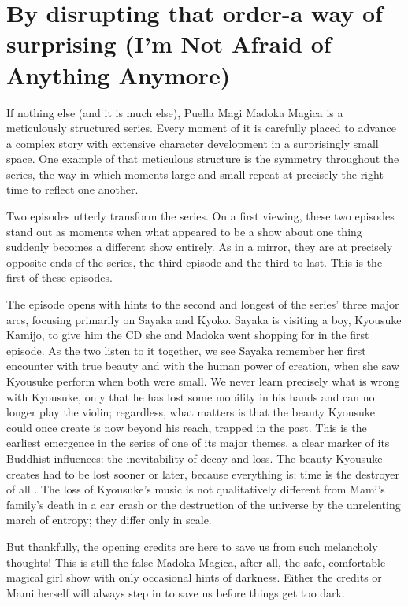 \chapter{By disrupting that order-a way of surprising (I'm Not Afraid of Anything Anymore)}

If nothing else (and it is much else), Puella Magi Madoka Magica is a meticulously structured series. Every moment of it is carefully placed to advance a complex story with extensive character development in a surprisingly small space. One example of that meticulous structure is the symmetry throughout the series, the way in which moments large and small repeat at precisely the right time to reflect one another.

Two episodes utterly transform the series. On a first viewing, these two episodes stand out as moments when what appeared to be a show about one thing suddenly becomes a different show entirely. As in a mirror, they are at precisely opposite ends of the series, the third episode and the third-to-last. This is the first of these episodes.

The episode opens with hints to the second and longest of the series' three major arcs, focusing primarily on Sayaka and Kyoko. Sayaka is visiting a boy, Kyousuke Kamijo, to give him the CD she and Madoka went shopping for in the first episode. As the two listen to it together, we see Sayaka remember her first encounter with true beauty and with the human power of creation, when she saw Kyousuke perform when both were small. We never learn precisely what is wrong with Kyousuke, only that he has lost some mobility in his hands and can no longer play the violin; regardless, what matters is that the beauty Kyousuke could once create is now beyond his reach, trapped in the past. This is the earliest emergence in the series of one of its major themes, a clear marker of its Buddhist influences: the inevitability of decay and loss. The beauty Kyousuke creates had to be lost sooner or later, because everything is; time is the destroyer of all \cite{ref33}. The loss of Kyousuke's music is not qualitatively different from Mami's family's death in a car crash or the destruction of the universe by the unrelenting march of entropy; they differ only in scale.

But thankfully, the opening credits are here to save us from such melancholy thoughts! This is still the false Madoka Magica, after all, the safe, comfortable magical girl show with only occasional hints of darkness. Either the credits or Mami herself will always step in to save us before things get too dark.

